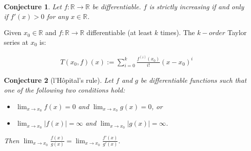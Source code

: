 \documentclass[aspectratio=169]{beamer}
\newtheorem{proposition}{Conjecture}[section]
\begin{document}
\begin{frame}
    \begin{proposition}
        Let $f:\mathbb{R}\rightarrow\mathbb{R}$ be differentiable. $f$ is strictly increasing if and only if $f'(x)>0$ for any $ x\in\mathbb{R}$.
    \end{proposition}
\end{frame}

\begin{frame}

\begin{definition}
    Given $x_0\in\mathbb{R}$ and $f:\mathbb{R}\rightarrow\mathbb{R}$ differentiable (at least $k$ times). The $k-order$ Taylor series at $x_0$ is:
    
    \begin{align*}
        T(x_0,f)(x):=\sum_{i=0}^k \frac{f^{(i)}(x_0)}{i!}(x-x_0)^i
    \end{align*}
\end{definition}
    
\end{frame}

\begin{frame}

\begin{proposition}[l'H\^ opital's rule]

Let $f$ and $g$ be differentiable functions such that one of the following two conditions hold:

\begin{itemize}
    \item $\lim_{x\rightarrow x_0} f(x)=0$ and $\lim_{x\rightarrow x_0} g(x)=0$, or
    \item $\lim_{x\rightarrow x_0} |f(x)|=\infty$ and $\lim_{x\rightarrow x_0} |g(x)|=\infty$.
\end{itemize}
    
    Then $\lim_{x\rightarrow x_0} \frac{f(x)}{g(x)}=\lim_{x\rightarrow x_0} \frac{f'(x)}{g'(x)}$.
    
\end{proposition}
\end{frame}
\end{document}
